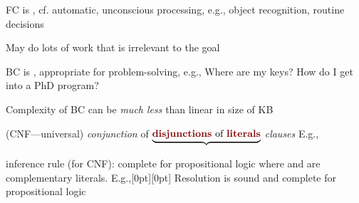\documentclass{article}
\begin{document}
\begin{huge}
\maxfigwidth
{}


\maxfigwidth
{}


\maxfigwidth
{}


\maxfigwidth
{}



FC is , cf. automatic, unconscious processing,\nl
e.g., object recognition, routine decisions

May do lots of work that is irrelevant to the goal

BC is , appropriate for problem-solving,\nl
e.g., Where are my keys? How do I get into a PhD program?

Complexity of BC can be \emph{much less} than linear in size of KB


 (CNF---universal)\nl
    \emph{conjunction} of $\underbrace{\mbox{\emph{disjunctions} of \emph{literals}}}$\nl
    \emph{clauses}\nl
    E.g., 

 inference rule (for CNF): complete for propositional logic
where  and  are complementary literals. E.g.,\hfill\epsfxsize=1.75in\raisebox{-1.5in}[0pt][0pt]{}
Resolution is sound and complete for propositional logic


\end{huge}
\end{document}
